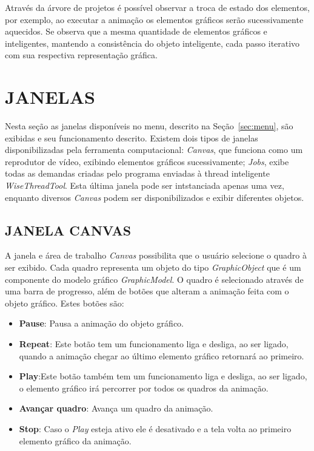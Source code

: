 \documentclass[a4paper,12pt]{monografia}
\theoremstyle{plain}
\theoremstyle{definition}
\theoremstyle{remark}
\begin{document}
Através da árvore de projetos é possível observar a troca de estado dos elementos, por exemplo, ao executar a animação os elementos gráficos serão sucessivamente aquecidos. Se observa que a mesma quantidade de elementos gráficos e inteligentes, mantendo a consistência do objeto inteligente, cada passo iterativo com sua respectiva representação gráfica.

\section{JANELAS}\label{sec:janelas}

Nesta seção as janelas disponíveis no menu, descrito na Seção~\ref{sec:menu}, são exibidas e seu funcionamento descrito. Existem dois tipos de janelas disponibilizadas pela ferramenta computacional: \textit{Canvas}, que funciona como um reprodutor de vídeo, exibindo elementos gráficos sucessivamente; \textit{Jobs}, exibe todas as demandas criadas pelo programa enviadas à thread inteligente \textit{WiseThreadTool}. Esta última janela pode ser intstanciada apenas uma vez, enquanto diversos \textit{Canvas} podem ser disponibilizados e exibir diferentes objetos.

\subsection{JANELA CANVAS}\label{sec:janela_canvas}

A janela e área de trabalho \textit{Canvas} possibilita que o usuário selecione o quadro à ser exibido. Cada quadro representa um objeto do tipo \textit{GraphicObject} que é um componente do modelo gráfico \textit{GraphicModel}. O quadro é selecionado através de uma barra de progresso, além de botões que alteram a animação feita com o objeto gráfico. Estes botões são:

\begin{itemize}
	\item \textbf{Pause}: Pausa a animação do objeto gráfico.
	\item \textbf{Repeat}: Este botão tem um funcionamento liga e desliga, ao ser ligado, quando a animação chegar ao último elemento gráfico retornará ao primeiro.
	\item \textbf{Play}:Este botão também tem um funcionamento liga e desliga, ao ser ligado, o elemento gráfico irá percorrer por todos os quadros da animação.
	\item \textbf{Avançar quadro}: Avança um quadro da animação.
	\item \textbf{Stop}: Caso o \textit{Play} esteja ativo ele é desativado e a tela volta ao primeiro elemento gráfico da animação.
\end{itemize}
\end{document}
